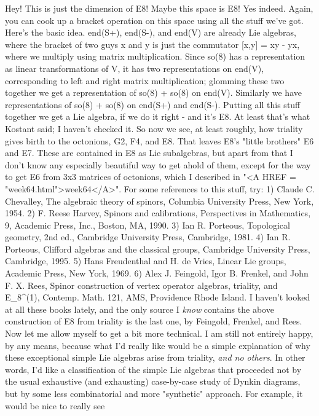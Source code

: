 Hey!  This is just the dimension of E8!  Maybe this space is E8!
Yes indeed.  Again, you can cook up a bracket operation on 
this space using all the stuff we've got.  Here's the basic
idea.  end(S+), end(S-), and end(V) are already Lie algebras,
where the bracket of two guys x and y is just the commutator
[x,y] = xy - yx, where we multiply using matrix multiplication.
Since so(8) has a representation as linear transformations of
V, it has two representations on end(V), corresponding to left
and right matrix multiplication; glomming these two together
we get a representation of so(8) + so(8) on end(V).  Similarly
we have representations of so(8) + so(8) on end(S+) and end(S-).
Putting all this stuff together we get a Lie algebra, if we
do it right - and it's E8.  At least that's what Kostant said;
I haven't checked it.
So now we see, at least roughly, how triality gives birth
to the octonions, G2, F4, and E8.  That leaves E8's "little
brothers" E6 and E7.  These are contained in E8 as Lie subalgebras,
but apart from that I don't know any especially beautiful way 
to get ahold of them, except for the way to get E6 from 3x3
matrices of octonions, which I described in "<A HREF = 
"week64.html">week64</A>".  
For some references to this stuff, try:
1) Claude C. Chevalley, The algebraic theory of spinors, 
Columbia University Press, New York, 1954.
2) F. Reese Harvey, Spinors and calibrations, Perspectives in 
Mathematics, 9, Academic Press, Inc., Boston, MA, 1990.
3) Ian R. Porteous, Topological geometry, 2nd ed., Cambridge University 
Press, Cambridge, 1981.
4) Ian R. Porteous, Clifford algebras and the classical groups,
Cambridge University Press, Cambridge, 1995.  
5) Hans Freudenthal and H. de Vries, Linear Lie groups, Academic Press, 
New York, 1969.
6) Alex J. Feingold, Igor B. Frenkel, and John F. X. Rees,
Spinor construction of vertex operator algebras, triality, and
E_8^{(1)}, Contemp. Math. 121, AMS, Providence Rhode Island.
I haven't looked at all these books lately, and the only 
source I \emph{know} contains the above construction of E8 from
triality is the last one, by Feingold, Frenkel, and Rees.
Now let me allow myself to get a bit more technical.
I am still not entirely happy, by any means, because what I'd
really like would be a simple explanation of why these exceptional
simple Lie algebras arise from triality, \emph{and no others}.  In other
words, I'd like a classification of the simple Lie algebras
that proceeded not by the usual exhaustive (and exhausting) case-by-case
study of Dynkin diagrams, but by some less combinatorial and more
"synthetic" approach.  For example, it would be nice to really see
